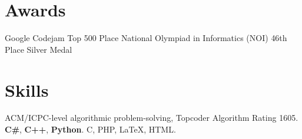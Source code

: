 \documentclass[10pt,a4paper,roman]{moderncv} %
\begin{document}
\section{Awards}
        {Google Codejam}
        {Top 500 Place}
        {}{}{}
        {National Olympiad in Informatics (NOI)}
        {46th Place}
        {Silver Medal}
        {}{}

\section{Skills}
       {ACM/ICPC-level algorithmic problem-solving, Topcoder Algorithm Rating 1605\footnotemark[8]{}.}
       {\textbf{C\#}, \textbf{C++}, \textbf{Python}.\newline{}%
        C, PHP, \LaTeX, HTML.}
\end{document}
